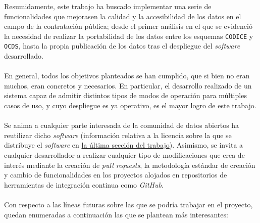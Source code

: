 
    Resumidamente, este trabajo ha buscado implementar una serie de funcionalidades que mejorasen la calidad y la accesibilidad de los datos en el campo de la contratación pública; desde el primer análisis en el que se evidenció la necesidad de realizar la portabilidad de los datos entre los esquemas \texttt{CODICE} y \texttt{OCDS}, hasta la propia publicación de los datos tras el despliegue del \textit{software} desarrollado.
    \\ \\
    En general, todos los objetivos planteados se han cumplido, que si bien no eran muchos, eran concretos y necesarios. En particular, el desarrollo realizado de un sistema capaz de admitir distintos tipos de modos de operación para múltiples casos de uso, y cuyo despliegue es ya operativo, es el mayor logro de este trabajo. 
    \\ \\
    Se anima a cualquier parte interesada de la comunidad de datos abiertos ha reutilizar dicho \textit{software} (información relativa a la licencia sobre la que se distribuye el \textit{software} en \hyperref[sec:consideraciones]{la última sección del trabajo}). Asimismo, se invita a cualquier desarrollador a realizar cualquier tipo de modificaciones que crea de interés mediante la creación de \textit{pull requests}, la metodología estándar de creación y cambio de funcionalidades en los proyectos alojados en repositorios de herramientas de integración continua como \textit{GitHub}.
    \\ \\
    Con respecto a las líneas futuras sobre las que se podría trabajar en el proyecto, quedan enumeradas a continuación las que se plantean más interesantes:

